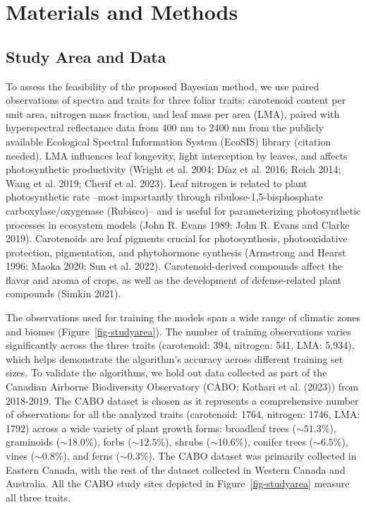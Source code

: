\documentclass[
  letterpaper,
  DIV=11,
  numbers=noendperiod]{scrartcl}
\begin{document}
\hypertarget{materials-and-methods}{%
\section{Materials and Methods}\label{materials-and-methods}}

\hypertarget{study-area-and-data}{%
\subsection{Study Area and Data}\label{study-area-and-data}}

To assess the feasibility of the proposed Bayesian method, we use paired
observations of spectra and traits for three foliar traits: carotenoid
content per unit area, nitrogen mass fraction, and leaf mass per area
(LMA), paired with hyperspectral reflectance data from 400 nm to 2400 nm
from the publicly available Ecological Spectral Information System
(EcoSIS) library (citation needed). LMA influences leaf longevity, light
interception by leaves, and affects photosynthetic productivity (Wright
et al. 2004; Díaz et al. 2016; Reich 2014; Wang et al. 2019; Cherif et
al. 2023). Leaf nitrogen is related to plant photosynthetic rate --most
importantly through ribulose-1,5-bisphosphate carboxylase/oxygenase
(Rubisco)-- and is useful for parameterizing photosynthetic processes in
ecosystem models (John R. Evans 1989; John R. Evans and Clarke 2019).
Carotenoids are leaf pigments crucial for photosynthesis, photooxidative
protection, pigmentation, and phytohormone synthesis (Armstrong and
Hearst 1996; Maoka 2020; Sun et al. 2022). Carotenoid-derived compounds
affect the flavor and aroma of crops, as well as the development of
defense-related plant compounds (Simkin 2021).

The observations used for training the models span a wide range of
climatic zones and biomes (Figure~\ref{fig-studyarea}). The number of
training observations varies significantly across the three traits
(carotenoid: 394, nitrogen: 541, LMA: 5,934), which helps demonstrate
the algorithm's accuracy across different training set sizes. To
validate the algorithms, we hold out data collected as part of the
Canadian Airborne Biodiversity Observatory (CABO; Kothari et al. (2023))
from 2018-2019. The CABO dataset is chosen as it represents a
comprehensive number of observations for all the analyzed traits
(carotenoid: 1764, nitrogen: 1746, LMA: 1792) across a wide variety of
plant growth forms: broadleaf trees (\(\sim 51.3 \%\)), graminoids
(\(\sim 18.0 \%\)), forbs (\(\sim 12.5 \%\)), shrubs (\(\sim 10.6 \%\)),
conifer trees (\(\sim 6.5 \%\)), vines (\(\sim 0.8 \%\)), and ferns
(\(\sim 0.3 \%\)). The CABO dataset was primarily collected in Eastern
Canada, with the rest of the dataset collected in Western Canada and
Australia. All the CABO study sites depicted in
Figure~\ref{fig-studyarea} measure all three traits.
\end{document}
